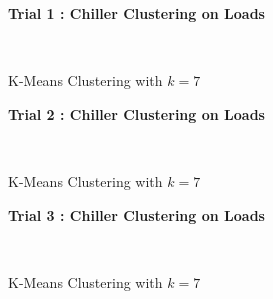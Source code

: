 \begin{figure}[!h]
\centerline{\bfseries\Large Trial 1 : Chiller Clustering on Loads}\\
\caption{K-Means Clustering with $k=7$}
\end{figure}
\begin{figure}[!h]
\centerline{\bfseries\Large Trial 2 : Chiller Clustering on Loads}\\
\caption{K-Means Clustering with $k=7$}
\end{figure}
\begin{figure}[!h]
\centerline{\bfseries\Large Trial 3 : Chiller Clustering on Loads}\\
\caption{K-Means Clustering with $k=7$}
\end{figure}
